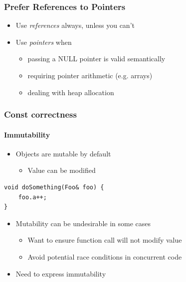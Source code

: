 \documentclass[table]{beamer}
\newcounter{rulecount}
\newcommand{\declarerule}{\textbf{\color{themeblue}{Rule \therulecount:}} }
\newcommand{\declarelesson}{\textbf{\color{themegreen}{Lesson:}} }
\begin{document}
\begin{frame}
    \frametitle{\declarerule Prefer References to Pointers}
    \fontsize{12pt}{14}\selectfont
    \begin{itemize}
        \item Use \emph{references} always, unless you can't
        \item Use \emph{pointers} when
            \begin{itemize}
    \fontsize{10pt}{11}\selectfont
                \item passing a NULL pointer is valid semantically
                \item requiring pointer arithmetic (e.g. arrays)
                \item dealing with heap allocation
            \end{itemize}
    \end{itemize}
\end{frame}


\begin{frame}[fragile]
    \frametitle{\declarelesson Const correctness}
    \framesubtitle{Immutability}
    \begin{itemize}
        \item Objects are mutable by default
            \begin{itemize}
                \item Value can be modified
            \end{itemize}
    \end{itemize}
    \begin{lstlisting}[title=Passing mutable object]
void doSomething(Foo& foo) {
    foo.a++;
}
    \end{lstlisting}
    \begin{itemize}
        \item Mutability can be undesirable in some cases
            \begin{itemize}
                \item Want to ensure function call will not modify value
                \item Avoid potential race conditions in concurrent code
            \end{itemize}
        \item Need to express immutability
    \end{itemize}
\end{frame}
\end{document}
